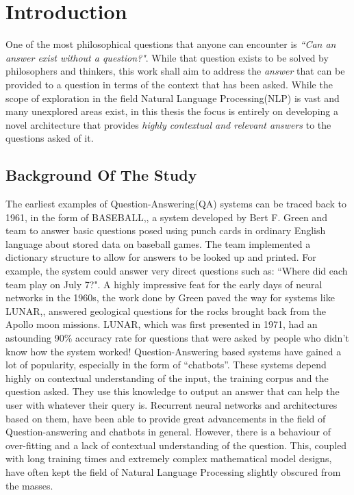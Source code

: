 \documentclass[a4paper,12pt]{report}
\begin{document}
    \tableofcontents
    \newpage
    \listoffigures
    \listoftables
    
    \printnomenclature[1in]

    
    \chapter{Introduction}\label{c1introduction}
    One of the most philosophical questions that anyone can encounter is \textit{``Can an answer exist without a question?"}. While that question exists to be solved by philosophers and thinkers, this work shall aim to address the \textit{answer} that can be provided to a question in terms of the context that has been asked. While the scope of exploration in the field Natural Language Processing(NLP) is vast and many unexplored areas exist, in this thesis the focus is entirely on developing a novel architecture that provides \textit{highly contextual and relevant answers} to the questions asked of it.

        \section{Background Of The Study}\label{c11}
		    The earliest examples of Question-Answering(QA) systems can be traced back to 1961, in the form of BASEBALL,\citep{green1961baseball}, a system developed by Bert F. Green and team to answer basic questions posed using punch cards in ordinary English language about stored data on baseball games. The team implemented a dictionary structure to allow for answers to be looked up and printed. For example, the system could answer very direct questions such as: ``Where did each team play on July 7?".
		    A highly impressive feat for the early days of neural networks in the 1960s, the work done by Green paved the way for systems like LUNAR,\citep{lunar}, answered geological questions for the rocks brought back from the Apollo moon missions. LUNAR, which was first presented in 1971, had an astounding 90\% accuracy rate for questions that were asked by people who didn't know how the system worked!
		    Question-Answering based systems have gained a lot of popularity, especially in the form of ``chatbots''. These systems depend highly on contextual understanding of the input, the training corpus and the question asked. They use this knowledge to output an answer that can help the user with whatever their query is. Recurrent neural networks and architectures based on them, have been able to provide great advancements in the field of Question-answering and chatbots in general. However, there is a behaviour of over-fitting and a lack of contextual understanding of the question. This, coupled with long training times and extremely complex mathematical model designs, have often kept the field of Natural Language Processing slightly obscured from the masses.
\end{document}
